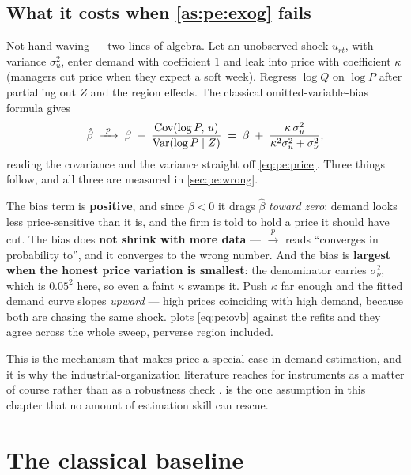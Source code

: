 \subsection*{What it costs when \texorpdfstring{\cref{as:pe:exog}}{Assumption 5.1} fails}

Not hand-waving --- two lines of algebra. Let an unobserved shock $u_{rt}$, with variance
$\sigma_u^2$, enter demand with coefficient $1$ and leak into price with coefficient $\kappa$
(managers cut price when they expect a soft week). Regress $\log Q$ on $\log P$ after partialling
out $Z$ and the region effects. The classical omitted-variable-bias formula gives
%
\begin{equation}
  \hat\beta \;\xrightarrow{\ p\ }\; \beta \;+\;
  \frac{\operatorname{Cov}(\log P,\, u)}{\operatorname{Var}(\log P \mid Z)}
  \;=\; \beta \;+\; \frac{\kappa\,\sigma_u^{2}}{\kappa^{2}\sigma_u^{2} + \sigma_\nu^{2}},
  \label{eq:pe:ovb}
\end{equation}
%
reading the covariance and the variance straight off \cref{eq:pe:price}. Three things follow, and
all three are measured in \cref{sec:pe:wrong}.

The bias term is \textbf{positive}, and since $\beta < 0$ it drags $\hat\beta$ \emph{toward zero}:
demand looks less price-sensitive than it is, and the firm is told to hold a price it should have
cut. The bias does \textbf{not shrink with more data} --- $\xrightarrow{p}$ reads ``converges in
probability to'', and it converges to the wrong number. And the bias is \textbf{largest when the
honest price variation is smallest}: the denominator carries $\sigma_\nu^{2}$, which is $0.05^2$
here, so even a faint $\kappa$ swamps it. Push $\kappa$ far enough and the fitted demand curve
slopes \emph{upward} --- high prices coinciding with high demand, because both are chasing the same
shock.  plots \cref{eq:pe:ovb} against the refits and they agree across the whole
sweep, perverse region included.

This is the mechanism that makes price a special case in demand estimation, and it is why the
industrial-organization literature reaches for instruments as a matter of course rather than as a
robustness check \citep{berry1994, blp1995, nevo2000}.  is the one assumption in
this chapter that no amount of estimation skill can rescue.

\section{The classical baseline}
\label{sec:pe:classical}

